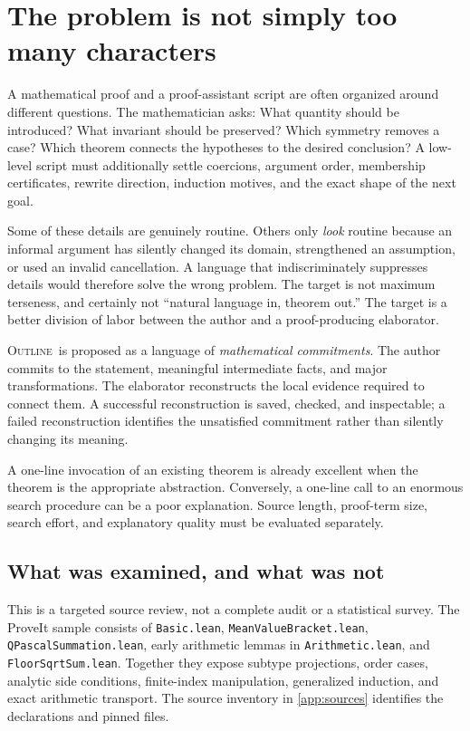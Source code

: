 \documentclass[11pt,a4paper]{article}
\newcommand{\code}[1]{\nolinkurl{#1}}
\newcommand{\Outline}{\textsc{Outline}}
\theoremstyle{definition}
\theoremstyle{remark}
\numberwithin{equation}{section}
\begin{document}
\clearpage

\section{The problem is not simply too many characters}
\label{sec:thesis}
A mathematical proof and a proof-assistant script are often organized around different questions. The mathematician asks: What quantity should be introduced? What invariant should be preserved? Which symmetry removes a case? Which theorem connects the hypotheses to the desired conclusion? A low-level script must additionally settle coercions, argument order, membership certificates, rewrite direction, induction motives, and the exact shape of the next goal.

Some of these details are genuinely routine. Others only \emph{look} routine because an informal argument has silently changed its domain, strengthened an assumption, or used an invalid cancellation. A language that indiscriminately suppresses details would therefore solve the wrong problem. The target is not maximum terseness, and certainly not ``natural language in, theorem out.'' The target is a better division of labor between the author and a proof-producing elaborator.

\Outline\ is proposed as a language of \emph{mathematical commitments}. The author commits to the statement, meaningful intermediate facts, and major transformations. The elaborator reconstructs the local evidence required to connect them. A successful reconstruction is saved, checked, and inspectable; a failed reconstruction identifies the unsatisfied commitment rather than silently changing its meaning.

A one-line invocation of an existing theorem is already excellent when the theorem is the appropriate abstraction. Conversely, a one-line call to an enormous search procedure can be a poor explanation. Source length, proof-term size, search effort, and explanatory quality must be evaluated separately.

\subsection{What was examined, and what was not}
This is a targeted source review, not a complete audit or a statistical survey. The ProveIt sample consists of \code{Basic.lean}, \code{MeanValueBracket.lean}, \code{QPascalSummation.lean}, early arithmetic lemmas in \code{Arithmetic.lean}, and \code{FloorSqrtSum.lean}. Together they expose subtype projections, order cases, analytic side conditions, finite-index manipulation, generalized induction, and exact arithmetic transport. The source inventory in \cref{app:sources} identifies the declarations and pinned files.\cite{p-basic,p-mean,p-qpascal,p-arithmetic,p-floor}
\end{document}

